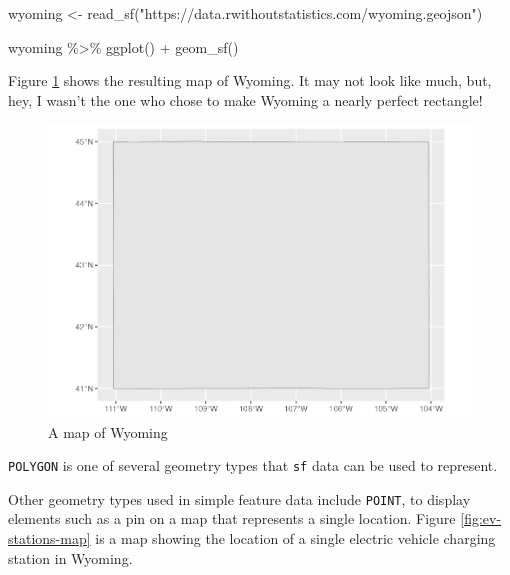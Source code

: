 \documentclass[
]{book}
\newenvironment{Shaded}{\begin{snugshade}}{\end{snugshade}}
\newcommand{\FunctionTok}[1]{\textcolor[rgb]{0.00,0.00,0.00}{#1}}
\newcommand{\NormalTok}[1]{#1}
\newcommand{\OtherTok}[1]{\textcolor[rgb]{0.56,0.35,0.01}{#1}}
\newcommand{\SpecialCharTok}[1]{\textcolor[rgb]{0.00,0.00,0.00}{#1}}
\newcommand{\StringTok}[1]{\textcolor[rgb]{0.31,0.60,0.02}{#1}}
\begin{document}
\begin{Shaded}
\begin{Highlighting}[]
\NormalTok{wyoming }\OtherTok{\textless{}{-}} \FunctionTok{read\_sf}\NormalTok{(}\StringTok{"https://data.rwithoutstatistics.com/wyoming.geojson"}\NormalTok{)}

\NormalTok{wyoming }\SpecialCharTok{\%\textgreater{}\%}
  \FunctionTok{ggplot}\NormalTok{() }\SpecialCharTok{+}
  \FunctionTok{geom\_sf}\NormalTok{()}
\end{Highlighting}
\end{Shaded}

Figure \ref{fig:wyoming-map-plot} shows the resulting map of Wyoming. It may not look like much, but, hey, I wasn't the one who chose to make Wyoming a nearly perfect rectangle!

\begin{figure}
\includegraphics[width=1\linewidth]{maps_files/figure-latex/wyoming-map-plot-1} \caption{A map of Wyoming}\label{fig:wyoming-map-plot}
\end{figure}

\texttt{POLYGON} is one of several geometry types that \texttt{sf} data can be used to represent.

Other geometry types used in simple feature data include \texttt{POINT}, to display elements such as a pin on a map that represents a single location. Figure \ref{fig:ev-stations-map} is a map showing the location of a single electric vehicle charging station in Wyoming.
\end{document}
